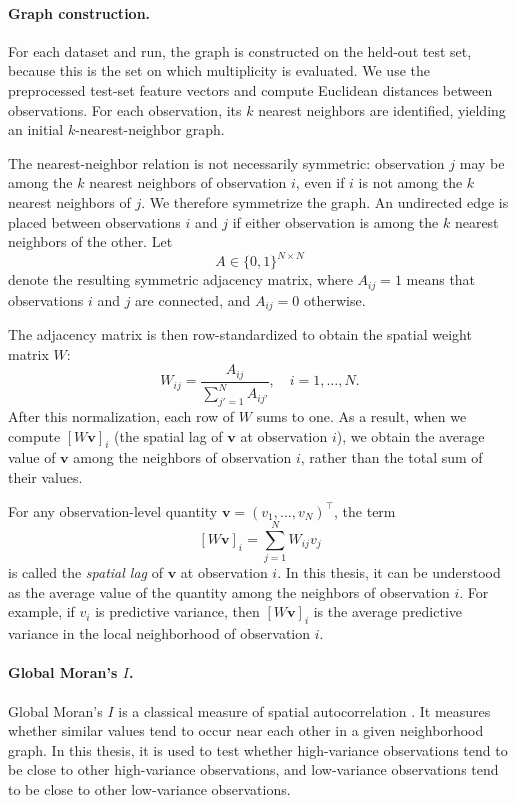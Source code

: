 \paragraph{Graph construction.}
\label{sec:method-spatial}

For each dataset and run, the graph is constructed on the held-out test set, because this
is the set on which multiplicity is evaluated. We use the preprocessed test-set feature
vectors and compute Euclidean distances between observations. For each observation, its
$k$ nearest neighbors are identified, yielding an initial $k$-nearest-neighbor graph.

The nearest-neighbor relation is not necessarily symmetric: observation $j$ may be among
the $k$ nearest neighbors of observation $i$, even if $i$ is not among the $k$ nearest
neighbors of $j$. We therefore symmetrize the graph. An undirected edge is placed
between observations $i$ and $j$ if either observation is among the $k$ nearest neighbors
of the other. Let
\[
A \in \{0,1\}^{N \times N}
\]
denote the resulting symmetric adjacency matrix, where $A_{ij}=1$ means that
observations $i$ and $j$ are connected, and $A_{ij}=0$ otherwise.

The adjacency matrix is then row-standardized to obtain the spatial weight matrix $W$:
\[
W_{ij} =
\frac{A_{ij}}{\sum_{j'=1}^{N} A_{ij'}},
\quad i = 1,\dots,N.
\]
After this normalization, each row of $W$ sums to one. As a result, when we compute
$[W\mathbf{v}]_i$ (the spatial lag of $\mathbf{v}$ at observation $i$), we obtain the average value of $\mathbf{v}$ among the neighbors of
observation $i$, rather than the total sum of their values.

For any observation-level quantity $\mathbf{v}=(v_1,\dots,v_N)^\top$, the term
\[
[W\mathbf{v}]_i = \sum_{j=1}^{N} W_{ij} v_j
\]
is called the \emph{spatial lag} of $\mathbf{v}$ at observation $i$. In this thesis, it can be
understood as the average value of the quantity among the neighbors of observation $i$.
For example, if $v_i$ is predictive variance, then $[W\mathbf{v}]_i$ is the average
predictive variance in the local neighborhood of observation $i$.

\paragraph{Global Moran's $I$.}
\label{sec:meth-moran}

Global Moran's $I$ is a classical measure of spatial autocorrelation
\citep{moran1950notes}. It measures whether similar values tend to occur near each
other in a given neighborhood graph. In this thesis, it is used to test whether
high-variance observations tend to be close to other high-variance observations, and
low-variance observations tend to be close to other low-variance observations.

